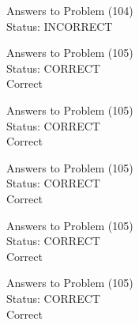 \documentclass[11pt]{article}
\begin{document}
\begin{minipage}[t]{0.5\textwidth}
  {\centering
  
  Answers to Problem (104)\\
  Status: INCORRECT\\
  
  }
\end{minipage}
\begin{minipage}[t]{0.5\textwidth}
  {\centering
  
  Answers to Problem (105)\\
  Status: CORRECT\\
  Correct\\
  }
\end{minipage}
\begin{minipage}[t]{0.5\textwidth}
  {\centering
  
  Answers to Problem (105)\\
  Status: CORRECT\\
  Correct\\
  }
\end{minipage}
\begin{minipage}[t]{0.5\textwidth}
  {\centering
  
  Answers to Problem (105)\\
  Status: CORRECT\\
  Correct\\
  }
\end{minipage}
\begin{minipage}[t]{0.5\textwidth}
  {\centering
  
  Answers to Problem (105)\\
  Status: CORRECT\\
  Correct\\
  }
\end{minipage}
\begin{minipage}[t]{0.5\textwidth}
  {\centering
  
  Answers to Problem (105)\\
  Status: CORRECT\\
  Correct\\
  }
\end{minipage}
\end{document}
